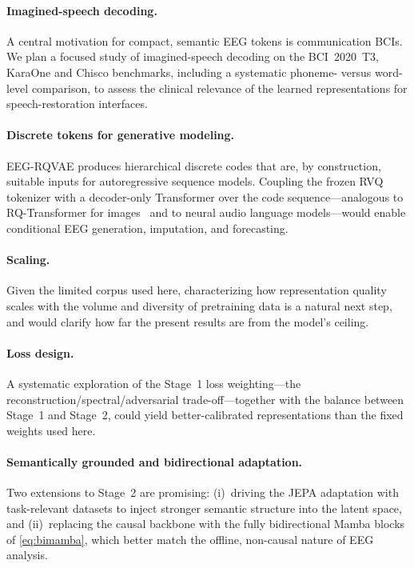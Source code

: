 \documentclass{article}
\begin{document}
\paragraph{Imagined-speech decoding.}
A central motivation for compact, semantic EEG tokens is communication BCIs.
We plan a focused study of imagined-speech decoding on the BCI~2020~T3, KaraOne and Chisco benchmarks, including a systematic phoneme- versus word-level comparison, to assess the clinical relevance of the learned representations for speech-restoration interfaces.

\paragraph{Discrete tokens for generative modeling.}
EEG-RQVAE produces hierarchical discrete codes that are, by construction, suitable inputs for autoregressive sequence models.
Coupling the frozen RVQ tokenizer with a decoder-only Transformer over the code sequence---analogous to RQ-Transformer for images~\citep{9879532} and to neural audio language models---would enable conditional EEG generation, imputation, and forecasting.

\paragraph{Scaling.}
Given the limited corpus used here, characterizing how representation quality scales with the volume and diversity of pretraining data is a natural next step, and would clarify how far the present results are from the model's ceiling.

\paragraph{Loss design.}
A systematic exploration of the Stage~1 loss weighting---the reconstruction/spectral/adversarial trade-off---together with the balance between Stage~1 and Stage~2, could yield better-calibrated representations than the fixed weights used here.

\paragraph{Semantically grounded and bidirectional adaptation.}
Two extensions to Stage~2 are promising: (i)~driving the JEPA adaptation with task-relevant datasets to inject stronger semantic structure into the latent space, and (ii)~replacing the causal backbone with the fully bidirectional Mamba blocks of \cref{eq:bimamba}, which better match the offline, non-causal nature of EEG analysis.
\end{document}
